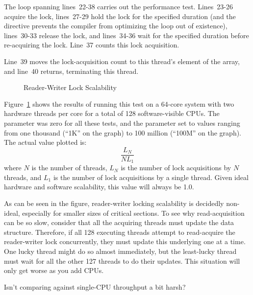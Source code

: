 The loop spanning lines~22-38 carries out the performance test.
Lines~23-26 acquire the lock, lines~27-29 hold the lock for the specified
duration (and the  directive prevents the compiler from
optimizing the loop out of existence), lines~30-33 release the lock,
and lines~34-36 wait for the specified duration before re-acquiring the
lock.
Line~37 counts this lock acquisition.

Line~39 moves the lock-acquisition count to this thread's element of the
 array, and line~40 returns, terminating this thread.

\begin{figure}[tb]
\centering
{}
\caption{Reader-Writer Lock Scalability}
\label{fig:toolsoftrade:Reader-Writer Lock Scalability}
\end{figure}

Figure~\ref{fig:toolsoftrade:Reader-Writer Lock Scalability}
shows the results of running this test on a 64-core  system
with two hardware threads per core for a total of 128 software-visible
CPUs.
The  parameter was zero for all these tests, and the
 parameter set to values ranging from one thousand (``1K''
on the graph) to 100 million (``100M'' on the graph).
The actual value plotted is:
\begin{equation}
	\frac{L_N}{N L_1}
\end{equation}
where $N$ is the number of threads,
$L_N$ is the number of lock acquisitions by $N$ threads, and
$L_1$ is the number of lock acquisitions by a single thread.
Given ideal hardware and software scalability, this value will always
be 1.0.

As can be seen in the figure, reader-writer locking scalability is
decidedly non-ideal, especially for smaller sizes of critical
sections.
To see why read-acquisition can be so slow, consider
that all the acquiring threads must update the 
data structure.
Therefore, if all 128 executing threads attempt to
read-acquire the reader-writer lock concurrently, they must update
this underlying  one at a time.
One lucky thread might do so almost immediately, but the least-lucky
thread must wait for all the other 127 threads to do their updates.
This situation will only get worse as you add CPUs.

\QuickQuiz{}
	Isn't comparing against single-CPU throughput a bit harsh?
 \QuickQuizEnd

